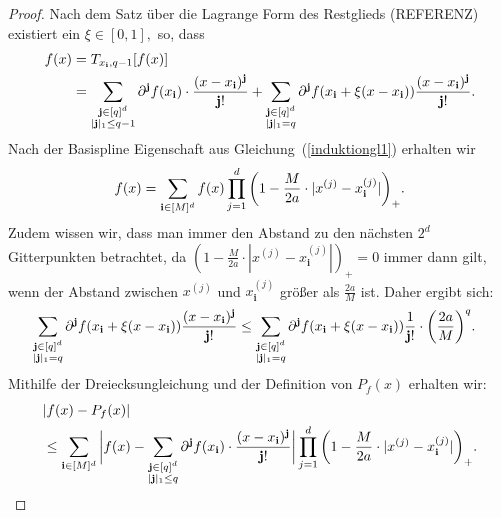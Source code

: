 \begin{proof}
Nach dem Satz über die Lagrange Form des Restglieds (REFERENZ) existiert ein $\xi \in [0, 1],$ so, dass 
\begin{equation}
\label{eq:lagrange}
\begin{split}
f(x) & = T_{x_{\mathbf{i}},q - 1}[f(x)] \\
& = \sum_{\substack{\mathbf{j} \in [q]^d \\ |\mathbf{j}|_1 \leq q - 1}}  \partial^{\mathbf{j}}f(x_{\mathbf{i}}) \cdot \frac{ (x - x_{\mathbf{i}})^{\mathbf{j}} }{\mathbf{j}!} + \sum_{\substack{ \mathbf{j} \in [q]^d \\|\mathbf{j}|_1 = q}} \partial^{\mathbf{j}}f(x_{\mathbf{i}} + \xi(x - x_{\mathbf{i}})) \frac{ (x - x_{\mathbf{i}})^{\mathbf{j}} }{\mathbf{j}!}.
\end{split}
\end{equation}
Nach der Basispline Eigenschaft aus Gleichung~(\ref{induktiongl1}) erhalten wir 
$$f(x) = \sum_{\mathbf{i} \in [M]^d} f(x) \prod_{j = 1}^d \bigg(1 - \frac{M}{2a} \cdot |x^{(j)} - x_{\mathbf{i}}^{(j)}|\bigg)_+.$$ Zudem wissen wir, dass man immer den Abstand zu den nächsten $2^d$ Gitterpunkten betrachtet, da  $(1 - \frac{M}{2a} \cdot |x^{(j)} - x_{\mathbf{i}}^{(j)}|)_+ = 0$ immer dann gilt, wenn der Abstand zwischen $x^{(j)}$ und $x_{\mathbf{i}}^{(j)}$ größer als $\frac{2a}{M}$ ist. Daher ergibt sich:
\begin{equation}
\label{eq:absch}
\begin{split}
& \sum_{\substack{ \mathbf{j} \in [q]^d \\ |\mathbf{j}|_1 = q}} \partial^{\mathbf{j}}f(x_{\mathbf{i}} + \xi(x - x_{\mathbf{i}})) \frac{ (x - x_{\mathbf{i}})^{\mathbf{j}} }{\mathbf{j}!} \leq \sum_{\substack{ \mathbf{j} \in [q]^d \\ |\mathbf{j}|_1 = q}} \partial^{\mathbf{j}}f(x_{\mathbf{i}} + \xi(x - x_{\mathbf{i}})) \frac{1}{\mathbf{j}!} \cdot \bigg(\frac{2a}{M}\bigg)^q.
\end{split}
\end{equation} 
Mithilfe der Dreiecksungleichung und der Definition von $P_f(x)$ erhalten wir:
\begin{equation}
\label{eq:drei}
\begin{split}
& |f(x) - P_f(x)| \\
& \leq \sum_{\mathbf{i} \in [M]^d} \bigg|f(x) - \sum_{\substack{\mathbf{j} \in [q]^d \\|\mathbf{j}|_1 \leq q}} \partial^{\mathbf{j}}f(x_{\mathbf{i}}) \cdot \frac{(x - x_{\mathbf{i}})^{\mathbf{j}}}{\mathbf{j}!}\bigg| \prod_{j = 1}^d \bigg(1 - \frac{M}{2a} \cdot |x^{(j)} - x_{\mathbf{i}}^{(j)}|\bigg)_+.
\end{split}
\end{equation}

\end{proof}
